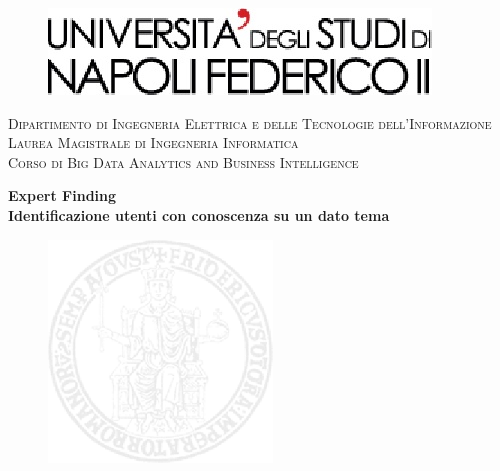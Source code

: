 \documentclass[a4paper,12pt]{report}
\begin{document}
	
	
	\begin{titlepage}
		\begin{figure}
			\vspace{-1cm}
			\centering
			\includegraphics[scale=0.8]{image/logo.jpg}\\[1cm]
		\end{figure}
		
		\begin{center}
			{\large  \textsc{Dipartimento di Ingegneria Elettrica e delle Tecnologie dell'Informazione}}\\[0.5cm]
			{\large  \textsc{Laurea Magistrale di Ingegneria Informatica}}\\[0.5cm]
			{\large  \textsc{Corso di Big Data Analytics and Business Intelligence}}\\[1cm]
		\end{center}
		\begin{center}
			\bfseries\Huge\sc Expert Finding\\[0.3cm]\normalsize\sc Identificazione utenti con conoscenza su un dato tema\\ 
		\end{center}
		
		
		\begin{figure}[H]
			\centering
			\includegraphics[]{image/filigrana.png}
		\end{figure}
		

\end{titlepage}
\end{document}
